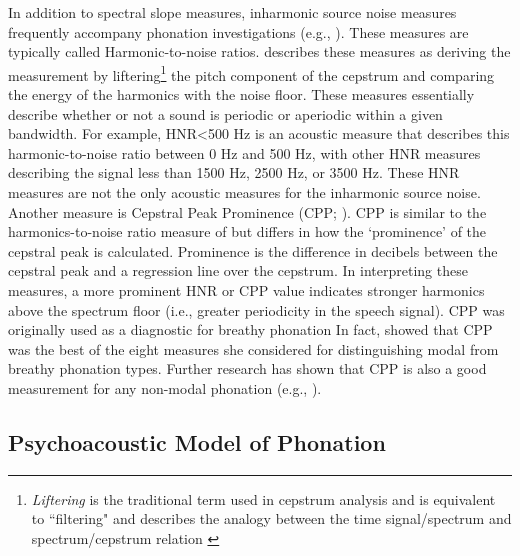 \documentclass[12pt, letterpaper]{article}
\begin{document}
In addition to spectral slope measures, inharmonic source noise measures frequently accompany phonation investigations (e.g., \cite{garellekPhoneticsWhiteHmong2021}). These measures are typically called Harmonic-to-noise ratios. \citet{dekromCepstrumBasedTechniqueDetermining1993} describes these measures as deriving the measurement by liftering\footnote{\textit{Liftering} is the traditional term used in cepstrum analysis and is equivalent to ``filtering" and describes the analogy between the time signal/spectrum and spectrum/cepstrum relation \citep[257]{dekromCepstrumBasedTechniqueDetermining1993}} the pitch component of the cepstrum and comparing the energy of the harmonics with the noise floor. These measures essentially describe whether or not a sound is periodic or aperiodic within a given bandwidth. For example, HNR\textless 500 Hz is an acoustic measure that describes this harmonic-to-noise ratio between 0 Hz and 500 Hz, with other HNR measures describing the signal less than 1500 Hz, 2500 Hz, or 3500 Hz. These HNR measures are not the only acoustic measures for the inharmonic source noise. Another measure is Cepstral Peak Prominence (CPP; \cite{hillenbrandAcousticCorrelatesBreathy1994,hillenbrandAcousticCorrelatesBreathy1996}). CPP is similar to the harmonics-to-noise ratio measure of \citet{dekromCepstrumBasedTechniqueDetermining1993} but differs in how the ‘prominence’ of the cepstral peak is calculated. Prominence is the difference in decibels between the cepstral peak and a regression line over the cepstrum. In interpreting these measures, a more prominent HNR or CPP value indicates stronger harmonics above the spectrum floor (i.e., greater periodicity in the speech signal). CPP was originally used as a diagnostic for breathy phonation \citep{blankenshipTimingNonmodalPhonation2002,espositoVariationContrastivePhonation2010} In fact, \citeauthor{espositoEffectsLinguisticExperience2010} showed that CPP was the best of the eight measures she considered for distinguishing modal from breathy phonation types. Further research has shown that CPP is also a good measurement for any non-modal phonation (e.g., \cite{andruskiPhonationTypesProduction2000,andruskiToneClarityMixed2006,blankenshipTimingNonmodalPhonation2002,waylandAcousticCorrelatesBreathy2003,avelinoAcousticElectroglottographicAnalyses2010}). 

\subsection{Psychoacoustic Model of Phonation} \label{sec:PMoP}
\end{document}
